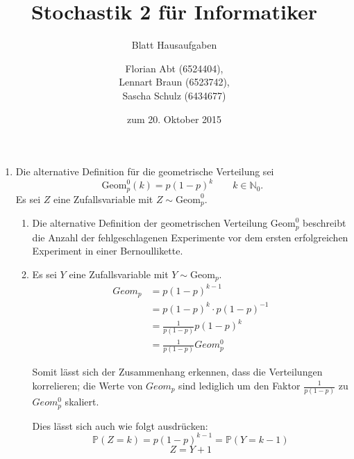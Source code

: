 \documentclass[a4paper]{scrartcl}
\title{Stochastik 2 für Informatiker}
\subtitle{Blatt \blattnr Hausaufgaben}
\author{
    Florian Abt (6524404), \\
    Lennart Braun (6523742), \\
    Sascha Schulz (6434677)
}
\date{zum 20. Oktober 2015}
\newcommand{\prob}{\mathbb{P}}
\begin{document}
\maketitle

\begin{enumerate}[label=\bfseries 1.\arabic*]
    \item
        Die alternative Definition für die geometrische Verteilung sei
        \begin{equation*}
            \text{Geom}_p^0(k) = p(1-p)^k \qquad k \in \mathbb{N}_0 \text{.}
        \end{equation*}
        Es sei $Z$ eine Zufallsvariable mit $Z \sim \text{Geom}_p^0$.
        \begin{enumerate}[label=\alph*)]
            \item
                Die alternative Definition der geometrischen Verteilung
                $\text{Geom}_p^0$ beschreibt die Anzahl der fehlgeschlagenen
                Experimente vor dem ersten erfolgreichen Experiment in einer
                Bernoullikette.

            \item
                Es sei $Y$ eine Zufallsvariable mit $Y \sim \text{Geom}_p$.              
                \begin{equation*}
		  \begin{split}
                    Geom_p
                    &= p(1-p)^{k-1} \\
                    &= p(1-p)^k \cdot p(1-p)^{-1} \\
                    &= \frac{1}{p(1-p)} p(1-p)^k \\
                    &= \frac{1}{p(1-p)} Geom_p^0
                  \end{split}
                \end{equation*}
                
                Somit lässt sich der Zusammenhang erkennen, dass die Verteilungen korrelieren; 
                die Werte von $Geom_p$ sind lediglich um den Faktor $\frac1{p(1-p)}$ zu $Geom_p^0$ skaliert.
                
                Dies lässt sich auch wie folgt ausdrücken:
                \begin{equation*}
                    \prob(Z=k) = p(1-p)^{k-1} = \prob(Y=k-1)
                \end{equation*}
                \begin{equation*}
                    Z = Y + 1
                \end{equation*}
        \end{enumerate}


\end{enumerate}
\end{document}
